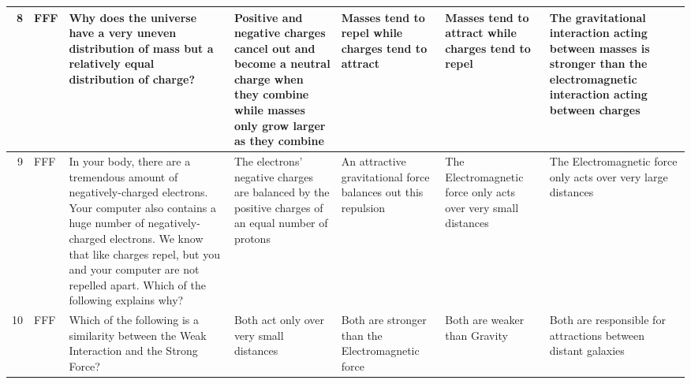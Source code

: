 \documentclass[10pt]{article}
\begin{document}
\begin{tiny}
\begin{longtable}{|r|p{0.375in}|p{1.275in}|p{0.75in}|p{0.75in}|p{0.75in}|p{0.75in}|}
    8     &     FFF &                                                                                                                                                                     Why does the universe have a very uneven distribution of mass but a relatively equal distribution of charge? &  Positive and negative charges cancel out and become a neutral charge when they combine while masses only grow larger as they combine &                                                    Masses tend to repel while charges tend to attract &                                                                         Masses tend to attract while charges tend to repel &       The gravitational interaction acting between masses is stronger than the electromagnetic interaction acting between charges \\\hline
    9     &     FFF &  In your body, there are a tremendous amount of negatively-charged electrons. Your computer also contains a huge number of negatively-charged electrons. We know that like charges repel, but you and your computer are not repelled apart. Which of the following explains why? &                                    The electrons' negative charges are balanced by the positive charges of an equal number of protons &                                         An attractive gravitational force balances out this repulsion &                                                              The Electromagnetic force only acts over very small distances &                                                                     The Electromagnetic force only acts over very large distances \\\hline
    10    &     FFF &                                                                                                                                                                                        Which of the following is a similarity between the Weak Interaction and the Strong Force? &                                                                                               Both act only over very small distances &                                                      Both are stronger than the Electromagnetic force &                                                                                               Both are weaker than Gravity &                                                                     Both are responsible for attractions between distant galaxies \\\hline

\end{longtable}
\end{tiny}
\end{document}
